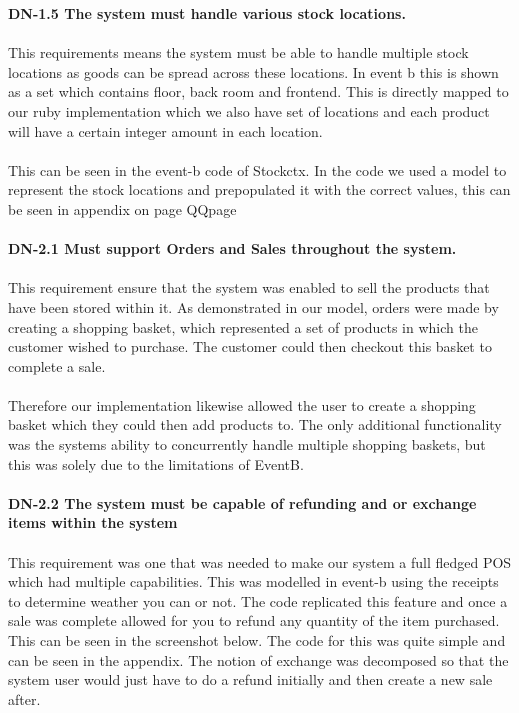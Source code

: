\documentclass[a4paper]{article}
\begin{document}
\textbf{DN-1.5 The system must handle various stock locations.}
\\\\
This requirements means the system must be able to handle multiple stock locations as goods can be spread across these locations. In event b this is shown as a set which contains floor, back room and frontend. This is directly mapped to our ruby implementation which we also have set of locations and each product will have a certain integer amount in each location. 
\\\\
This can be seen in the event-b code of Stockctx. In the code we used a model to represent the stock locations and prepopulated it with the correct values, this can be seen in appendix on page QQpage
\\\\
\textbf{DN-2.1 Must support Orders and Sales throughout the system.}
\\\\
This requirement ensure that the system was enabled to sell the products that have been stored within it. As demonstrated in our model, orders were made by creating a shopping basket, which represented a set of products in which the customer wished to purchase. The customer could then checkout this basket to complete a sale.
\\\\
Therefore our implementation likewise allowed the user to create a shopping basket which they could then add products to. The only additional functionality was the systems ability to concurrently handle multiple shopping baskets, but this was solely due to the limitations of EventB.
\\\\
\textbf{DN-2.2 The system must be capable of refunding and or exchange items within the system}
\\\\
This requirement was one that was needed to make our system a full fledged POS which had multiple capabilities. This was modelled in event-b using the receipts to determine weather you can or not. The code replicated this feature and once a sale was complete allowed for you to refund any quantity of the item purchased. This can be seen in the screenshot below. The code for this was quite simple and can be seen in the appendix. The notion of exchange was decomposed so that the system user would just have to do a refund initially and then create a new sale after. 
\\\\
\end{document}
